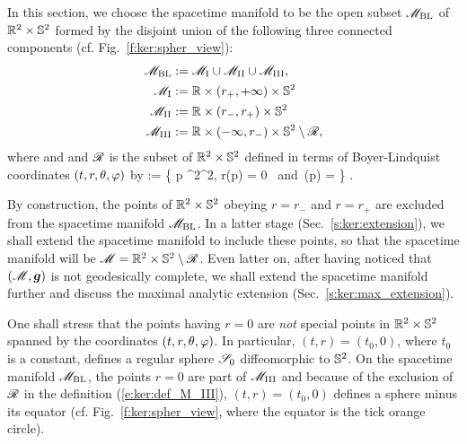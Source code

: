 In this section, we choose the spacetime manifold to be the open subset $\mathscr{M}_{\rm BL}$
of $\mathbb{R}^2\times\mathbb{S}^2$ formed by the disjoint union of
the following three connected components (cf. Fig.~\ref{f:ker:spher_view}):
\begin{subequations}
\begin{align}
    \mathscr{M}_{\rm BL} & :=  \mathscr{M}_{\rm I} \cup \mathscr{M}_{\rm II} \cup \mathscr{M}_{\rm III} , \label{e:ker:def_M_BL} \\
    \mathscr{M}_{\rm I} & :=  \mathbb{R}\times(r_+,+\infty)\times\mathbb{S}^2 \label{e:ker:def_M_I}\\
    \mathscr{M}_{\rm II} & :=  \mathbb{R}\times(r_-,r_+)\times\mathbb{S}^2 \\
    \mathscr{M}_{\rm III} & :=  \mathbb{R}\times(-\infty,r_-)\times\mathbb{S}^2 \setminus \mathscr{R}, \label{e:ker:def_M_III}
\end{align}
\end{subequations}
where
\be \label{e:ker:def_r_pm}
     \quad\mbox{and}\quad  {}
\ee
and $\mathscr{R}$ is the subset of $\mathbb{R}^2\times\mathbb{S}^2$ defined in terms of Boyer-Lindquist coordinates $(t,r,\theta,\varphi)$ by
\be \label{e:ker:def_ring}
    \ring := \left\{ p \in \R^2\times\SS^2,
        \quad r(p) = 0 \ \mbox{and}\ \th(p) =  \right\} .
\ee
\begin{remark}
By construction, the points of $\mathbb{R}^2\times\mathbb{S}^2$ obeying $r=r_-$ and $r=r_+$ are
excluded from the spacetime manifold $\mathscr{M}_{\rm BL}$. In a latter stage
(Sec.~\ref{s:ker:extension}), we shall extend the spacetime manifold to
include these points, so that the spacetime manifold will be $\mathscr{M} = \mathbb{R}^2\times\mathbb{S}^2\setminus \mathscr{R}$. Even latter on, after having noticed that $(\mathscr{M},\bm{g})$ is not geodesically complete,
we shall extend the spacetime manifold further and discuss the maximal analytic
extension (Sec.~\ref{s:ker:max_extension}).
\end{remark}

\begin{remark} \label{r:ker:r_zero}
One shall stress that the points having $r=0$ are \emph{not} special points in
$\mathbb{R}^2\times\mathbb{S}^2$ spanned by the coordinates $(t,r,\theta,\varphi)$. In particular,
$(t,r) = (t_0, 0)$, where $t_0$ is a constant, defines a regular sphere
$\mathscr{S}_0$ diffeomorphic to $\mathbb{S}^2$. On the spacetime manifold $\mathscr{M}_{\rm BL}$, the
points $r=0$ are part of $\mathscr{M}_{\rm III}$ and because of the exclusion of $\mathscr{R}$
in the definition (\ref{e:ker:def_M_III}), $(t,r) = (t_0, 0)$ defines
a sphere minus its equator (cf. Fig.~\ref{f:ker:spher_view}, where the equator
is the tick orange circle).
\end{remark}

